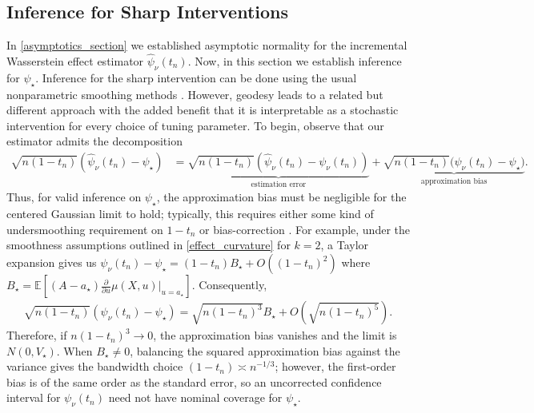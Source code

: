 \documentclass[11pt,twoside]{article}
\theoremstyle{definition}
\theoremstyle{remark}
\begin{document}
\subsection{Inference for Sharp Interventions} \label{endpoint_section}

In \cref{asymptotics_section} we established asymptotic normality for the incremental Wasserstein effect estimator $\widehat{\psi}_\nu(t_n)$. Now, in this section we establish inference for $\psi_\star$. Inference for the sharp intervention can be done using the usual nonparametric smoothing methods \citep{kennedy2017cte, takatsu2025}. However, geodesy leads to a related but different approach with the added benefit that it is interpretable as a stochastic intervention for every choice of tuning parameter. To begin, observe that our estimator admits the decomposition 
\begin{align*}
    \sqrt{n(1-t_n)} \left(\widehat\psi_\nu(t_n)- \psi_\star \right) &= \underbrace{
        \sqrt{n(1-t_n)} \left( \widehat\psi_\nu(t_n)- \psi_\nu(t_n) \right)}_{\text{estimation error}} + \underbrace{ \sqrt{n(1-t_n)} \Big(\psi_\nu(t_n)-\psi_\star
        \Big)}_{\text{approximation bias}}.
\end{align*}
Thus, for valid inference on $\psi_\star$, the approximation bias must be negligible for the centered Gaussian limit to hold; typically, this requires either some kind of undersmoothing requirement on $1 - t_n$ or bias-correction \citep{calonico2014, Calonico2018}. For example, under the smoothness assumptions outlined in \cref{effect_curvature} for $k=2$, a Taylor expansion gives us $\psi_\nu(t_n)-\psi_\star = (1-t_n) B_\star +O ((1-t_n)^2)$ where $B_\star = \mathbb{E}\left[(A-a_\star)\frac{\partial}{\partial u}\mu(X,u)|_{u=a_\star}\right]$.
Consequently,
\begin{align*}
    \sqrt{n(1-t_n)} \left( \psi_\nu(t_n)-\psi_\star\right) = \sqrt{n(1 - t_n)^3}B_\star + O\left(\sqrt{n(1-t_n)^5}\right).
\end{align*}
Therefore, if $n(1-t_n)^3\to0$, the approximation bias vanishes and the limit is $N(0,V_\star)$. When $B_\star \neq 0$, balancing the squared approximation bias against the variance gives the bandwidth choice $(1-t_n)\asymp n^{-1/3}$; however, the first-order bias is of the same order as the standard error, so an uncorrected confidence interval for $\psi_\nu(t_n)$ need not have nominal coverage for $\psi_\star$.
\end{document}
